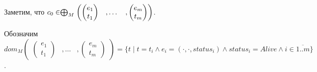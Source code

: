 Заметим, что $c_0 \in \mathrel{\bigoplus}_M
\begin{pmatrix}
\begin{pmatrix}
e_1 \\
t_1 
\end{pmatrix}& ,
\dots& ,
\begin{pmatrix}
e_m \\
t_m 
\end{pmatrix}
\end{pmatrix}$.

Обозначим $dom_M\begin{pmatrix}
\begin{pmatrix}
e_1 \\
t_1 
\end{pmatrix}& ,
\dots& ,
\begin{pmatrix}
e_m \\
t_m 
\end{pmatrix}
\end{pmatrix} = \{t \mid t = t_i \land e_i=(\cdot, \cdot, status_i) \land status_i = Alive \land i \in \overline{1..m}\}$.

